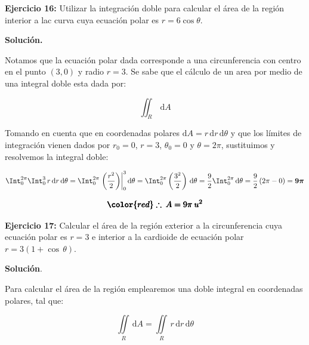 \documentclass[12pt]{article}
\begin{document}
\noindent \textbf{Ejercicio 16:} Utilizar la integración doble para calcular el área de la región interior a lac curva cuya ecuación polar es $r=6\cos\theta$.

\vspace{5mm}

\noindent \textbf{Solución.}

\vspace{3mm}

\noindent Notamos que la ecuación polar dada corresponde a una circunferencia con centro en el punto $(3, 0)$ y radio $r=3$. Se sabe que el cálculo de un area por medio de una integral doble esta dada por:

\begin{equation*}
	\iint_R\, \mathrm{d}A
\end{equation*}

\noindent Tomando en cuenta que en coordenadas polares $\mathrm{d}A = r\,\mathrm{d}r\,\mathrm{d}\theta$ y que los límites de integración vienen dados por $r_0 = 0$, $r = 3$, $\theta_0 = 0$ y $\theta = 2\pi$, sustituimos y resolvemos la integral doble:

\begin{align*}
	\Int_0^{2\pi} \Int_0^3\, r\,\mathrm{d}r\,\mathrm{d}\theta = \Int_0^{2\pi} \left.\left(\frac{r^2}{2}\right)\right|_0^3\mathrm{d}\theta = \Int_0^{2\pi} \left(\frac{3^2}{2}\right)\,\mathrm{d}\theta = \frac{9}{2}\Int_0^{2\pi} \,\mathrm{d}\theta = \frac{9}{2}\left(2\pi - 0\right) = \boldsymbol{9\pi}
\end{align*}

\begin{align*}
	\pmb{\color{red} \therefore\: A = 9\pi\: u^2}
\end{align*}

\noindent \textbf{Ejercicio 17:} Calcular el área de la región exterior a la circunferencia cuya ecuación polar es $r=3$ e interior a la cardioide de ecuación polar $r=3(1+\cos\,\theta)$.

\vspace{5mm}

\noindent \textbf{Solución}.

\vspace{3mm}

\noindent Para calcular el área de la región emplearemos una doble integral en coordenadas polares, tal que:

\begin{equation}\label{eqn:17-1}\tag{1}
	\iint\limits_R\, \mathrm{d}A = \iint\limits_R\, r\,\mathrm{d}r\,\mathrm{d}\theta
\end{equation}
\end{document}
